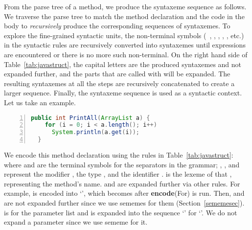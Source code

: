 From the parse tree of a method, we produce the syntaxeme sequence as
follows.
%
We traverse the parse tree to match the method declaration and the
code in the body to {\em recursively} produce the corresponding
sequences of syntaxemes.  To explore the fine-grained syntactic units,
the non-terminal symbols (\eg~, ,
, , , etc.) in the syntactic
rules are recursively converted into syntaxemes until expressions are
encountered or there is no more such non-terminal.
%
On the right hand side of Table~\ref{tab:javastruct}, the capital
letters are the produced syntaxemes and not expanded further,
and the parts that are called with  will be expanded.
%
The resulting syntaxemes at all the steps are recursively
concatenated to create a larger sequence. Finally, the syntaxeme sequence is used
as a syntactic context.
%
Let us take an example.

\begin{lstlisting}[basicstyle=\scriptsize\sffamily, stepnumber=1, numbers=left, language=Java, aboveskip=1pt,  belowskip=1pt, numbersep=-5pt]
  public int PrintAll(ArrayList a) {
    for (i = 0; i < a.length(); i++)
      System.println(a.get(i));
  }
\end{lstlisting}
We encode this method declaration using the rules in
Table~\ref{tab:javastruct}:\\ 
%
where  and  are the terminal symbols for the
separators in the grammar; , , and 
represent the modifier , the type , and the
identifier .
%
 is the lexeme of that , representing
the method's name.
%
 and  are expanded further via other
rules. For example,  is encoded into `', which becomes  after {\bf encode}(For) is run. Then,  and
  are not expanded further since we
use sememes for them (Section~\ref{sememesec}).
%
 is for the parameter list and is expanded into the
sequence `' for `'. We do not expand
a parameter since we use sememe for it.

